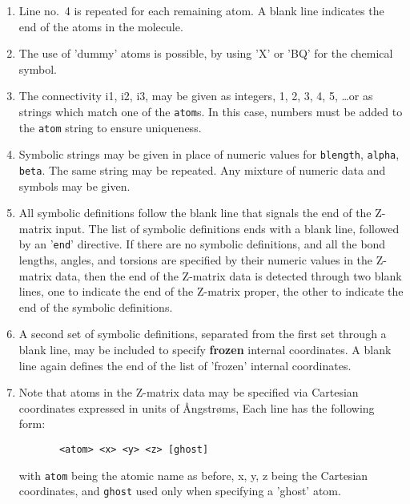 \begin{enumerate}
  \item Line no.\ 4  is repeated for each remaining atom. A blank line
        indicates the end of the atoms in the molecule.

  \item The use of 'dummy' atoms is possible, by using 'X' or 'BQ' for  the
chemical symbol.

  \item The connectivity i1, i2, i3, may be given as integers,
1, 2, 3, 4, 5, \ldots or as strings which match one of the {\tt atom}s.
In this case, numbers must be added to the {\tt atom} string to
ensure uniqueness.

   \item Symbolic strings may be given in place of  numeric  values  for
{\tt blength}, {\tt alpha},  {\tt beta}.  The  same  string may be repeated.  Any mixture of
    numeric data and symbols may be given.

   \item All symbolic definitions follow the blank line that signals  the
    end  of the Z-matrix input. The list of symbolic definitions ends with a
    blank line, followed by an '{\tt end}' directive. If there are no symbolic
    definitions, and  all  the  bond  lengths, angles, and torsions are
    specified by their numeric values in the Z-matrix data, then the
    end of the Z-matrix data is detected through two blank lines, one
    to indicate the end of the Z-matrix proper, the other to indicate
    the end of the symbolic definitions.

   \item A second set of  symbolic  definitions,  separated  from  the
    first  set through  a blank line, may be included to specify
    {\bf frozen} internal 
    coordinates. A blank line again  defines  the  end  of  the
    list  of  'frozen' internal coordinates.

   \item Note that atoms in the Z-matrix data may be specified via Cartesian
    coordinates expressed in units of {\AA}ngstr{\o}ms, Each line has the
    following form:

     \begin{verbatim}
       <atom> <x> <y> <z> [ghost]
     \end{verbatim}

    with  {\tt atom}  being  the atomic name as before, x, y, z being the
    Cartesian coordinates, and {\tt ghost} used only when specifying a
    'ghost' atom.
\end{enumerate}

